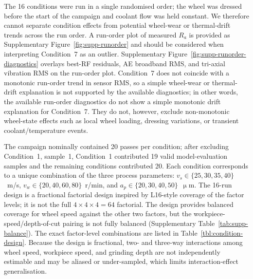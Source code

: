 The 16 conditions were run in a single randomised order; the wheel was
dressed before the start of the campaign and coolant flow was held
constant. We therefore cannot separate condition effects from potential
wheel-wear or thermal-drift trends across the run order. A run-order plot
of measured $R_a$ is provided as Supplementary
Figure~\ref{fig:supp-runorder} and should be considered when
interpreting Condition~7 as an outlier. Supplementary Figure~\ref{fig:supp-runorder-diagnostics} overlays best-RF
residuals, AE broadband RMS, and tri-axial vibration RMS on the run-order
plot. Condition~7 does not coincide with a monotonic run-order trend in
sensor RMS, so a simple wheel-wear or thermal-drift explanation is not
supported by the available diagnostics; in other words, the available
run-order diagnostics do not show a simple monotonic drift explanation
for Condition~7. They do not, however, exclude non-monotonic wheel-state
effects such as local wheel loading, dressing variations, or transient
coolant/temperature events.

The campaign nominally contained 20 passes per condition; after
excluding Condition~1, sample~1, Condition~1 contributed 19 valid
model-evaluation samples and the remaining conditions contributed 20.
Each condition corresponds to a unique combination of the three process
parameters: $v_s \in \{25,30,35,40\}$~m/s, $v_w \in
\{20,40,60,80\}$~r/min, and $a_p \in \{20,30,40,50\}$~\(\upmu\)m.
The 16-run design is a fractional factorial design inspired by
L16-style coverage of the factor levels; it is not the full
$4 \times 4 \times 4 = 64$ factorial. The design provides balanced coverage for wheel speed against the other
two factors, but the workpiece-speed/depth-of-cut pairing is not fully
balanced (Supplementary Table~\ref{tab:supp-balance}). The exact
factor-level combinations are listed in Table~\ref{tbl:condition-design}.
Because the design is fractional, two- and three-way interactions among
wheel speed, workpiece speed, and grinding depth are not independently
estimable and may be aliased or under-sampled, which limits
interaction-effect generalisation.

